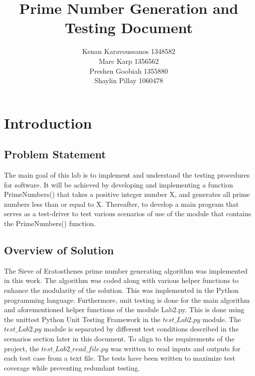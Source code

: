 \documentclass[]{article}
\title{Prime Number Generation and Testing Document}
\begin{document}
\author{
Kenan Karavoussanos 1348582 \\Marc Karp 1356562 \\Preshen Goobiah 1355880\\Shaylin Pillay 1060478}
    {}
\maketitle
\hfil \newpage
\tableofcontents
\hfil \newpage

\section{Introduction}


\subsection{Problem Statement}
The main goal of this lab is to implement and understand the testing procedures for software. It will be achieved by developing and implementing a function PrimeNumbers() that takes a positive integer number X, and generates all prime numbers less than or equal to X. Thereafter,  to develop a main program that serves as a test-driver to test various scenarios of use of the module that contains the PrimeNumbers() function.

\subsection{Overview of Solution}

The Sieve of Eratosthenes prime number generating algorithm was implemented in this work. The algorithm was coded along with various helper functions to enhance the modularity of the solution.
This was implemented in the Python programming language. Furthermore, unit testing is done for the main algorithm and aforementioned helper functions of the module Lab2.py. This is done using the unittest Python Unit Testing Framework in the $test\_Lab2.py$ module.
The $test\_Lab2.py$ module is separated by different test conditions described in the scenarios section later in this document. To align to the requirements of the project, the $test\_Lab2\_read\_file.py$ was written to read inputs and outputs for each test case from a text file. The tests have been written to maximize test coverage while preventing redundant testing. 
\end{document}
